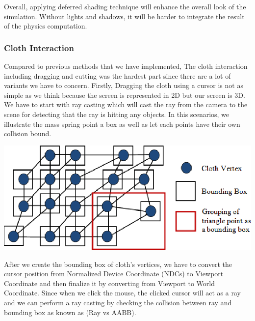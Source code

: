 \documentclass{article}
\begin{document}
\begin{multicols}{2}
\justifying
Overall, applying deferred shading technique will enhance the overall look of the simulation. Without lights and shadows, it will be harder to integrate the result of the physics computation.

\subsubsection{Cloth Interaction}
Compared to previous methods that we have implemented, The cloth interaction including dragging and cutting was the hardest part since there are a lot of variants we have to concern. Firstly, Dragging the cloth using a cursor is not as simple as we think because the screen is represented in 2D but our screen is 3D. We have to start with ray casting which will cast the ray from the camera to the scene for detecting that the ray is hitting any objects.
In this scenarios, we illustrate the mass spring point a box as well as let each points have their own collision bound.\newline

\includegraphics[width=\linewidth]{PointAABB}
\newline

\justifying
After we create the bounding box of cloth's vertices, we have to convert the cursor position from Normalized Device Coordinate (NDCs) to Viewport Coordinate and then finalize it by converting from Viewport to World Coordinate. Since when we click the mouse, the clicked cursor will act as a ray and we can perform a ray casting by checking the collision between
ray and bounding box as known as (Ray vs AABB).\newline


\end{multicols}
\end{document}

